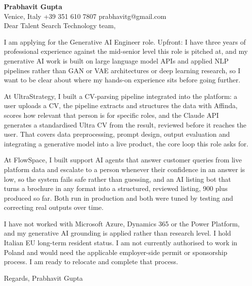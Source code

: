 \documentclass[a4paper,10.5pt]{article}
\begin{document}
\textbf{Prabhavit Gupta}\\
Venice, Italy \textbar{} +39 351 610 7807 \textbar{} prabhavitg@gmail.com\\[10pt]
Dear Talent Search Technology team,

I am applying for the Generative AI Engineer role. Upfront: I have three years of professional experience against the mid-senior level this role is pitched at, and my generative AI work is built on large language model APIs and applied NLP pipelines rather than GAN or VAE architectures or deep learning research, so I want to be clear about where my hands-on experience sits before going further.

At UltraStrategy, I built a CV-parsing pipeline integrated into the platform: a user uploads a CV, the pipeline extracts and structures the data with Affinda, scores how relevant that person is for specific roles, and the Claude API generates a standardised Ultra CV from the result, reviewed before it reaches the user. That covers data preprocessing, prompt design, output evaluation and integrating a generative model into a live product, the core loop this role asks for.

At FlowSpace, I built support AI agents that answer customer queries from live platform data and escalate to a person whenever their confidence in an answer is low, so the system fails safe rather than guessing, and an AI listing bot that turns a brochure in any format into a structured, reviewed listing, 900 plus produced so far. Both run in production and both were tuned by testing and correcting real outputs over time.

I have not worked with Microsoft Azure, Dynamics 365 or the Power Platform, and my generative AI grounding is applied rather than research level. I hold Italian EU long-term resident status. I am not currently authorised to work in Poland and would need the applicable employer-side permit or sponsorship process. I am ready to relocate and complete that process.

Regards,
Prabhavit Gupta
\end{document}

